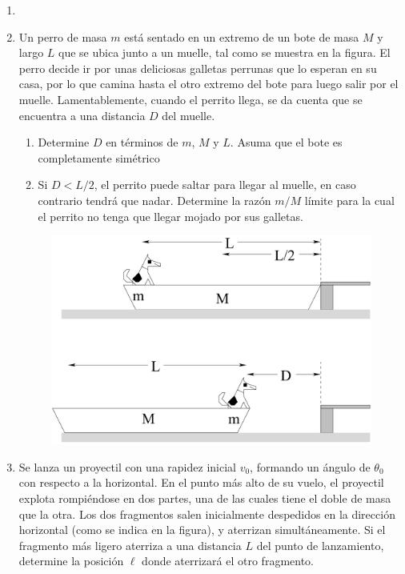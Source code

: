 \documentclass[letterpaper,11pt]{article}
\begin{document}
\vspace{-1cm}
\begin{enumerate}\setlength{\itemsep}{0.4cm}


\item[]

\item Un perro de masa $m$ está sentado en un extremo de un bote de masa $M$ y largo $L$ que se ubica junto a un muelle, tal como se muestra en la figura. El perro decide ir por unas deliciosas galletas perrunas que lo esperan en su casa, por lo que camina hasta el otro extremo del bote para luego salir por el muelle. Lamentablemente, cuando el perrito llega, se da cuenta que se encuentra a una distancia $D$ del muelle.

\begin{multicols}{2}
    \begin{enumerate}
        \item Determine $D$ en términos de $m$, $M$ y $L$. Asuma que el bote es completamente simétrico
        
        \item Si $D < L/2$, el perrito puede saltar para llegar al muelle, en caso contrario tendrá que nadar. Determine la razón $m/M$ límite para la cual el perrito no tenga que llegar mojado por sus galletas.
    \end{enumerate}
    
    \columnbreak
    
    \begin{figure}[H]
        \centering
        \includegraphics[width = 0.73\linewidth]{2022-1/img/aux11/perrito.PNG}
    \end{figure}
    
\end{multicols}

\item Se lanza un proyectil con una rapidez inicial $v_0$, formando un ángulo de $\theta_0$ con respecto a la horizontal. En el punto más alto de su vuelo, el proyectil explota rompiéndose en dos partes, una de las cuales tiene el doble de masa que la otra. Los dos fragmentos salen inicialmente despedidos en la dirección horizontal (como se indica en la figura), y aterrizan simultáneamente. Si el fragmento más ligero aterriza a una distancia $L$ del punto de lanzamiento, determine la posición $\ell$ donde aterrizará el otro fragmento.


\end{enumerate}
\end{document}
